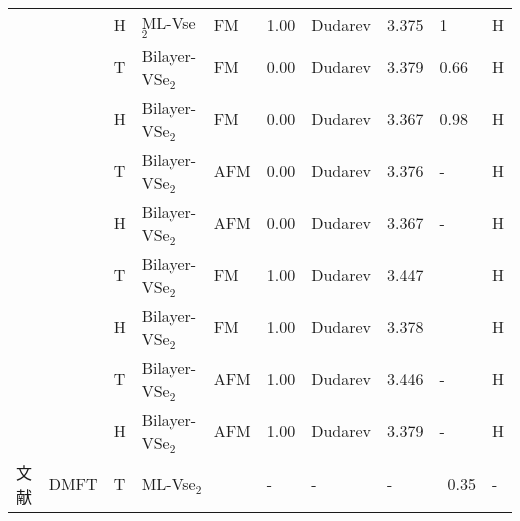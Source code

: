 \documentclass[reprint, aps, prb, showkeys]{revtex4-2}
\begin{document}
\begin{table*}
\begin{ruledtabular}
\begin{tabular}{llllllllll}
                                                                               &                 & H     & ML-Vse$_2$      & FM             & 1.00          & Dudarev & 3.375 & 1          & H            \\
                                                                               &                 & T     & Bilayer-VSe$_2$ & FM             & 0.00          & Dudarev & 3.379 & 0.66       & H            \\
                                                                               &                 & H     & Bilayer-VSe$_2$ & FM             & 0.00          & Dudarev & 3.367 & 0.98       & H            \\
                                                                               &                 & T     & Bilayer-VSe$_2$ & AFM            & 0.00          & Dudarev & 3.376 & -          & H            \\
                                                                               &                 & H     & Bilayer-VSe$_2$ & AFM            & 0.00          & Dudarev & 3.367 & -          & H            \\
                                                                               &                 & T     & Bilayer-VSe$_2$ & FM             & 1.00          & Dudarev & 3.447 &            & H            \\
                                                                               &                 & H     & Bilayer-VSe$_2$ & FM             & 1.00          & Dudarev & 3.378 &            & H            \\
                                                                               &                 & T     & Bilayer-VSe$_2$ & AFM            & 1.00          & Dudarev & 3.446 & -          & H            \\
                                                                               &                 & H     & Bilayer-VSe$_2$ & AFM            & 1.00          & Dudarev & 3.379 & -          & H            \\
            文献\cite{Kim_2020}                                                  & DMFT            & T     & \multicolumn{2}{l}{ML-Vse$_2$}   & -             & -                  & -     & ~0.35      & -           
            \end{tabular}
    \end{ruledtabular}
\end{table*}
\end{document}
